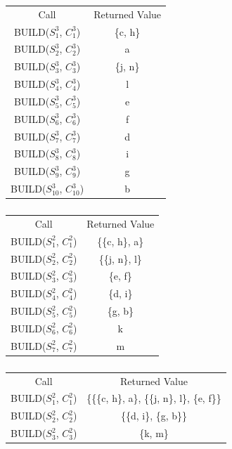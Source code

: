 \documentclass[11pt]{article} %
\begin{document}
\setcounter{subsubsection}{2}
\subsubsection{}
	\begin{center}
	\begin{tabular}{c c}
		Call & Returned Value \\
		BUILD($S_1^3$, $C_1^3$) & \{c, h\} \\
		BUILD($S_2^3$, $C_2^3$) & a \\
		BUILD($S_3^3$, $C_3^3$) & \{j, n\} \\
		BUILD($S_4^3$, $C_4^3$) & l \\
		BUILD($S_5^3$, $C_5^3$) & e \\
		BUILD($S_6^3$, $C_6^3$) & f \\
		BUILD($S_7^3$, $C_7^3$) & d \\
		BUILD($S_8^3$, $C_8^3$) & i \\
		BUILD($S_9^3$, $C_9^3$) & g \\
		BUILD($S_{10}^3$, $C_{10}^3$) & b
	\end{tabular}
	\end{center}

\setcounter{subsubsection}{1}
\subsubsection{}
	\begin{center}
	\begin{tabular}{c c}
		Call & Returned Value \\
		BUILD($S_1^2$, $C_1^2$) & \{\{c, h\}, a\} \\
		BUILD($S_2^2$, $C_2^2$) & \{\{j, n\}, l\} \\
		BUILD($S_3^2$, $C_3^2$) & \{e, f\} \\
		BUILD($S_4^2$, $C_4^2$) & \{d, i\} \\
		BUILD($S_5^2$, $C_5^2$) & \{g, b\} \\
		BUILD($S_6^2$, $C_6^2$) & k \\
		BUILD($S_7^2$, $C_7^2$) & m
	\end{tabular}
	\end{center}

\setcounter{subsubsection}{0}
\subsubsection{}
	\begin{center}
	\begin{tabular}{c c}
		Call & Returned Value \\
		BUILD($S_1^2$, $C_1^2$) & \{\{\{c, h\}, a\}, \{\{j, n\}, l\}, \{e, f\}\} \\
		BUILD($S_2^2$, $C_2^2$) & \{\{d, i\}, \{g, b\}\} \\
		BUILD($S_3^2$, $C_3^2$) & \{k, m\}
	\end{tabular}
	\end{center}
\end{document}
